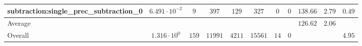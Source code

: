 \begin{tabular}{|l|c|c|c|c|c|c|c|c|c|c|}
subtraction:single\_prec\_subtraction\_0         & $ 6.491 \cdot 10^{-2} $ & $ 9      $ & $ 397   $ & $ 129  $ & $ 327   $ & $ 0  $ & $ 0 $ & $ 138.66      $ & $ 2.79    $ & $ 0.49    $ \\
\hline
Average                                          & $                     $ & $        $ & $       $ & $      $ & $       $ & $    $ & $   $ & $ 126.62      $ & $ 2.06    $ & $         $ \\
\hline
Overall                                          & $ 1.316 \cdot 10^{0}  $ & $ 159    $ & $ 11991 $ & $ 4211 $ & $ 15561 $ & $ 14 $ & $ 0 $ & $             $ & $         $ & $ 4.95    $ \\
\hline
\end{tabular}
